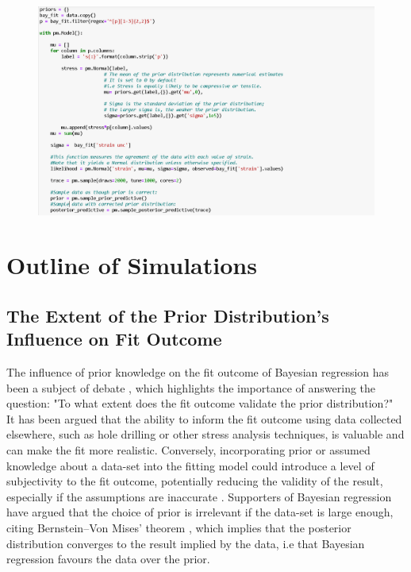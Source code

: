  \begin{figure}[H]
 	\centering
 	\includegraphics[width=0.8\linewidth]{chapters/chapter02/fig02/bayesfit.png}
 \end{figure}

\newpage
\section{Outline of Simulations}
\label{sec:sec01}

\subsection{The Extent of the Prior Distribution's Influence on Fit Outcome}
\label{subsec:subsec01}

The influence of prior knowledge on the fit outcome of Bayesian regression has been a subject of debate \cite{andrew_2015_can}, which highlights the importance of answering the question: "To what extent does the fit outcome validate the prior distribution?"\\

    It has been argued that the ability to inform the fit outcome using data collected elsewhere, such as hole drilling or other stress analysis techniques, is valuable and can make the fit more realistic.\cite{shaver_2017_a} Conversely, incorporating prior or assumed knowledge about a data-set into the fitting model could introduce a level of subjectivity to the fit outcome, potentially reducing the validity of the result, especially if the assumptions are inaccurate \cite{andrew_2015_can}. Supporters of Bayesian regression have argued that the choice of prior is irrelevant if the data-set is large enough, citing Bernstein–Von Mises' theorem \cite{Giordano_Kekkonen_2018}, which implies that the posterior distribution converges to the result implied by the data, i.e that Bayesian regression favours the data over the prior.\\ 

